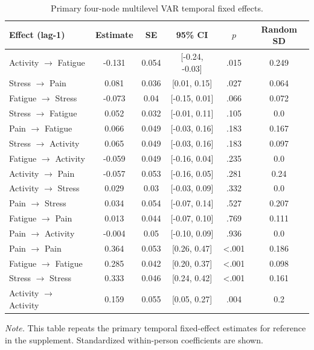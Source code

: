 \begin{table}[H]
\raggedright
\caption{Primary four-node multilevel VAR temporal fixed effects.}
\label{tab:sup-temporal}
\footnotesize
\begingroup
\setlength{\tabcolsep}{4pt}
\renewcommand{\arraystretch}{1.08}
\noindent
\begin{tabular*}{\textwidth}{@{\extracolsep{\fill}}lccccc@{}}
\toprule
Effect (lag-1) & Estimate & SE & 95\% CI & $p$ & Random SD \\
\midrule
Activity $\rightarrow$ Fatigue & -0.131 & 0.054 & [-0.24, -0.03] & .015 & 0.249 \\
Stress $\rightarrow$ Pain & 0.081 & 0.036 & [0.01, 0.15] & .027 & 0.064 \\
Fatigue $\rightarrow$ Stress & -0.073 & 0.04 & [-0.15, 0.01] & .066 & 0.072 \\
Stress $\rightarrow$ Fatigue & 0.052 & 0.032 & [-0.01, 0.11] & .105 & 0.0 \\
Pain $\rightarrow$ Fatigue & 0.066 & 0.049 & [-0.03, 0.16] & .183 & 0.167 \\
Stress $\rightarrow$ Activity & 0.065 & 0.049 & [-0.03, 0.16] & .183 & 0.097 \\
Fatigue $\rightarrow$ Activity & -0.059 & 0.049 & [-0.16, 0.04] & .235 & 0.0 \\
Activity $\rightarrow$ Pain & -0.057 & 0.053 & [-0.16, 0.05] & .281 & 0.24 \\
Activity $\rightarrow$ Stress & 0.029 & 0.03 & [-0.03, 0.09] & .332 & 0.0 \\
Pain $\rightarrow$ Stress & 0.034 & 0.054 & [-0.07, 0.14] & .527 & 0.207 \\
Fatigue $\rightarrow$ Pain & 0.013 & 0.044 & [-0.07, 0.10] & .769 & 0.111 \\
Pain $\rightarrow$ Activity & -0.004 & 0.05 & [-0.10, 0.09] & .936 & 0.0 \\
Pain $\rightarrow$ Pain & 0.364 & 0.053 & [0.26, 0.47] & <.001 & 0.186 \\
Fatigue $\rightarrow$ Fatigue & 0.285 & 0.042 & [0.20, 0.37] & <.001 & 0.098 \\
Stress $\rightarrow$ Stress & 0.333 & 0.046 & [0.24, 0.42] & <.001 & 0.161 \\
Activity $\rightarrow$ Activity & 0.159 & 0.055 & [0.05, 0.27] & .004 & 0.2 \\
\bottomrule
\end{tabular*}
\par\vspace{3pt}\noindent\parbox{\textwidth}{\footnotesize\textit{Note.} This table repeats the primary temporal fixed-effect estimates for reference in the supplement. Standardized within-person coefficients are shown.}
\endgroup
\end{table}

